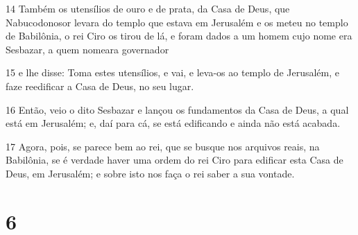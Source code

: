\par 14 Também os utensílios de ouro e de prata, da Casa de Deus, que Nabucodonosor levara do templo que estava em Jerusalém e os meteu no templo de Babilônia, o rei Ciro os tirou de lá, e foram dados a um homem cujo nome era Sesbazar, a quem nomeara governador
\par 15 e lhe disse: Toma estes utensílios, e vai, e leva-os ao templo de Jerusalém, e faze reedificar a Casa de Deus, no seu lugar.
\par 16 Então, veio o dito Sesbazar e lançou os fundamentos da Casa de Deus, a qual está em Jerusalém; e, daí para cá, se está edificando e ainda não está acabada.
\par 17 Agora, pois, se parece bem ao rei, que se busque nos arquivos reais, na Babilônia, se é verdade haver uma ordem do rei Ciro para edificar esta Casa de Deus, em Jerusalém; e sobre isto nos faça o rei saber a sua vontade.

\chapter{6}

